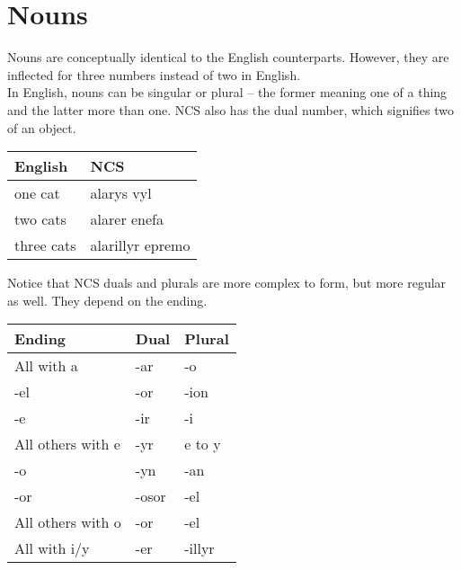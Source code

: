 \section{Nouns}

Nouns are conceptually identical to the English counterparts. However, they are inflected for three numbers instead of two in English. \\

In English, nouns can be singular or plural -- the former meaning one of a thing and the latter more than one. NCS also has the dual number, which signifies two of an object.

\begin{center}
  \begin{tabular}{|l|l|}
    \hline
    \textbf{English} & \textbf{NCS} \\ \hline
    one cat & alarys vyl \\ \hline
    two cats & alarer enefa \\ \hline
    three cats & alarillyr epremo \\ \hline
  \end{tabular}
\end{center}

Notice that NCS duals and plurals are more complex to form, but more regular as well. They depend on the ending.

\begin{center}
  \begin{tabular}{|p{4cm}|p{4cm}|p{4cm}|}
    \hline
    \textbf{Ending} & \textbf{Dual} & \textbf{Plural} \\ \hline
    All with a & -ar & -o \\ \hline
    -el & -or & -ion \\
    -e & -ir & -i \\
    All others with e & -yr & e to y \\ \hline
    -o & -yn & -an \\
    -or & -osor & -el \\
    All others with o & -or & -el \\ \hline
    All with i/y & -er & -illyr \\ \hline
  \end{tabular}
\end{center}
